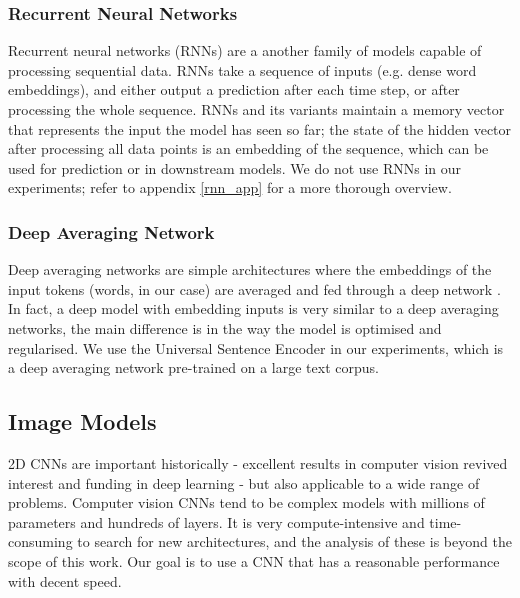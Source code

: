 \subsubsection{Recurrent Neural Networks}
\label{rnn}

Recurrent neural networks (RNNs) are a another family of models capable of processing sequential data.
RNNs take a sequence of inputs (e.g. dense word embeddings), and either output a prediction after each time step, or after processing the whole sequence.
RNNs and its variants maintain a memory vector that represents the input the model has seen so far; the state of the hidden vector after processing all data points is an embedding of the sequence, which can be used for prediction or in downstream models.
We do not use RNNs in our experiments; refer to appendix \ref{rnn_app} for a more thorough overview.

\subsubsection{Deep Averaging Network}

Deep averaging networks are simple architectures where the embeddings of the input tokens (words, in our case) are averaged and fed through a deep network \cite{dan}.
In fact, a deep model with embedding inputs is very similar to a deep averaging networks, the main difference is in the way the model is optimised and regularised.
We use the Universal Sentence Encoder \cite{uni_sent_enc} in our experiments, which is a deep averaging network pre-trained on a large text corpus.

\subsection{Image Models}
\label{image_models}

2D CNNs are important historically - excellent results in computer vision revived interest and funding in deep learning - but also applicable to a wide range of problems.
Computer vision CNNs tend to be complex models with millions of parameters and hundreds of layers.
It is very compute-intensive and time-consuming to search for new architectures, and the analysis of these is beyond the scope of this work.
Our goal is to use a CNN that has a reasonable performance with decent speed.

